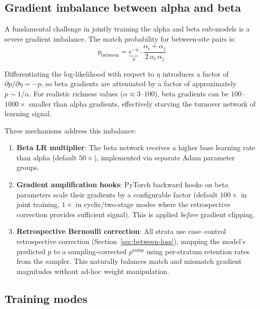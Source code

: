 \documentclass{article}
\begin{document}
\subsection{Gradient imbalance between alpha and beta}
\label{sec:grad-imbalance}

A fundamental challenge in jointly training the alpha and beta sub-models is a severe gradient imbalance. The match probability for between-site pairs is:
\begin{equation*}
    p_{\text{between}} = \underbrace{e^{-\eta}}_{S} \cdot \frac{\alpha_i + \alpha_j}{2\,\alpha_i\,\alpha_j}
\end{equation*}

Differentiating the log-likelihood with respect to $\eta$ introduces a factor of $\partial p / \partial \eta = -p$, so beta gradients are attenuated by a factor of approximately $p \sim 1/\alpha$. For realistic richness values ($\alpha \approx 3$--$100$), beta gradients can be $100$--$1000\times$ smaller than alpha gradients, effectively starving the turnover network of learning signal.

Three mechanisms address this imbalance:

\begin{enumerate}
    \item \textbf{Beta LR multiplier}: The beta network receives a higher base learning rate than alpha (default $50\times$), implemented via separate Adam parameter groups.
    
    \item \textbf{Gradient amplification hooks}: PyTorch backward hooks on beta parameters scale their gradients by a configurable factor (default $100\times$ in joint training, $1\times$ in cyclic/two-stage modes where the retrospective correction provides sufficient signal). This is applied \textit{before} gradient clipping.
    
    \item \textbf{Retrospective Bernoulli correction}: All strata use case--control retrospective correction (Section~\ref{sec:between-loss}), mapping the model's predicted $p$ to a sampling-corrected $p^{\text{samp}}$ using per-stratum retention rates from the sampler. This naturally balances match and mismatch gradient magnitudes without ad-hoc weight manipulation.
\end{enumerate}

\subsection{Training modes}
\label{sec:training-modes}
\end{document}
